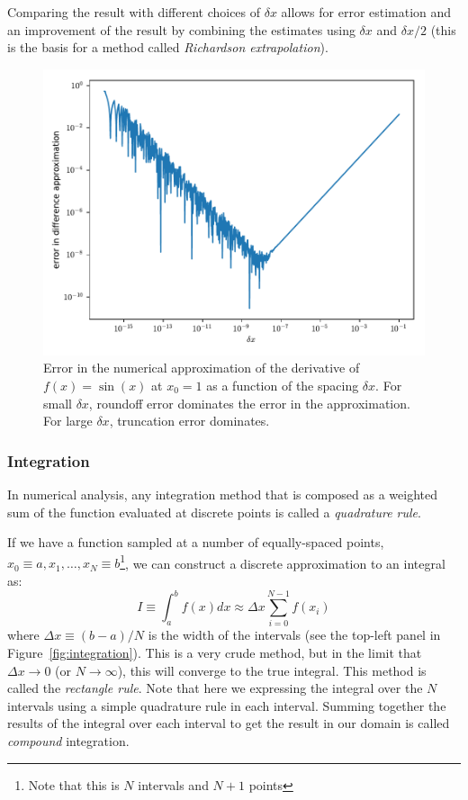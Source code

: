 Comparing the result with different choices of $\delta x$ allows for
error estimation and an improvement of the result by combining the
estimates using $\delta x$ and $\delta x/2$ (this is the basis for a
method called {\em Richardson extrapolation}).

\begin{figure}
  \centering
  \includegraphics[width=0.8\linewidth]{deriv_error}
  \caption[Error in numerical derivatives] {\label{fig:deriv_error}
    Error in the numerical approximation of the derivative of $f(x) =
    \sin(x)$ at $x_0 = 1$ as a function of the spacing $\delta x$.  For
    small $\delta x$, roundoff error dominates the error in the
    approximation.  For large $\delta x$, truncation error dominates.}
\end{figure}




\subsubsection{Integration}

In numerical analysis, any integration method that is composed as a
weighted sum of the function evaluated at discrete points is called a
{\em quadrature rule}.

If we have a function sampled at a number of
equally-spaced points, $x_0 \equiv a, x_1, \ldots, x_N \equiv
b$\footnote{Note that this is $N$ intervals and $N+1$ points}, we can
construct a discrete approximation to an integral as:
\begin{equation}
I \equiv \int_a^b f(x) dx \approx \Delta x \sum_{i = 0}^{N-1} f(x_i)
\end{equation}
where $\Delta x \equiv (b-a)/N$ is the width of the intervals (see the
top-left panel in Figure~\ref{fig:integration}).  This is a very crude
method, but in the limit that $\Delta x \rightarrow 0$ (or $N
\rightarrow \infty$), this will converge to the true integral.  This
method is called the {\em rectangle rule}.  Note that here we
expressing the integral over the $N$ intervals using a simple
quadrature rule in each interval.  Summing together the results of the
integral over each interval to get the result in our domain is called
{\em compound} integration.

